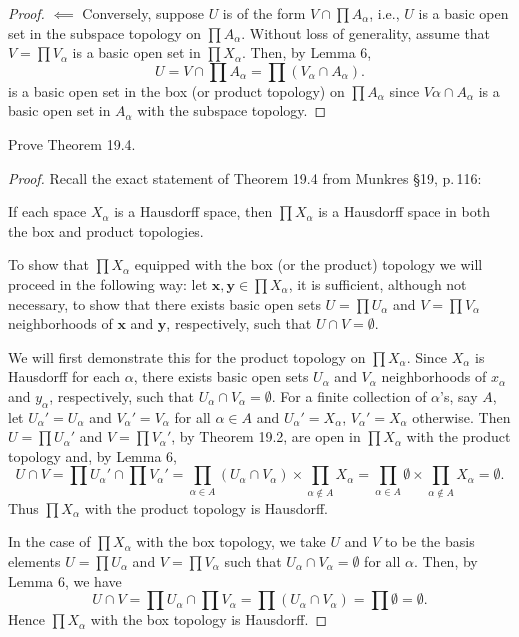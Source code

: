 \begin{proof}
$\impliedby$ Conversely, suppose $U$ is of the form $V\cap\prod
A_\alpha$, i.e., $U$ is a basic open set in the subspace topology
on $\prod A_\alpha$. Without loss of generality, assume that
$V=\prod V_\alpha$ is a basic open set in $\prod X_\alpha$. Then,
by Lemma 6,
\[
U=V\cap\prod A_\alpha=\prod\left(V_\alpha\cap A_\alpha\right).
\]
is a basic open set in the box (or product topology) on $\prod
A_\alpha$ since $V\alpha\cap A_\alpha$ is a basic open set in
$A_\alpha$ with the subspace topology.
\end{proof}
\newpage
\begin{problem}[Munkres \S19, p.\,118, \#3]
Prove Theorem 19.4.
\end{problem}
\begin{proof}
Recall the exact statement of Theorem 19.4 from Munkres \S19,
p.\,116:
\begin{theorem*}
If each space $X_\alpha$ is a Hausdorff space, then $\prod
X_\alpha$ is a Hausdorff space in both the box and product
topologies.
\end{theorem*}
To show that $\prod X_\alpha$ equipped with the box (or the
product) topology we will proceed in the following way: let
$\mathbf{x},\mathbf{y}\in\prod X_\alpha$, it is sufficient,
although not necessary, to show that there exists basic open sets
$U=\prod U_\alpha$ and $V=\prod V_\alpha$ neighborhoods of
$\mathbf{x}$ and $\mathbf{y}$, respectively, such that $U\cap
V=\emptyset$.

We will first demonstrate this for the product topology on $\prod
X_\alpha$. Since $X_\alpha$ is Hausdorff for each $\alpha$, there
exists basic open sets $U_\alpha$ and $V_\alpha$ neighborhoods of
$x_\alpha$ and $y_\alpha$, respectively, such that $U_\alpha\cap
V_\alpha=\emptyset$. For a finite collection of $\alpha$'s, say
$A$, let $U_\alpha'=U_\alpha$ and $V_\alpha'=V_\alpha$ for all
$\alpha\in A$ and $U_\alpha'=X_\alpha$, $V_\alpha'=X_\alpha$
otherwise. Then $U=\prod U_\alpha'$ and $V=\prod V_\alpha'$, by
Theorem 19.2, are open in $\prod X_\alpha$ with the product
topology and, by Lemma 6,
\[
U\cap V=\prod U_\alpha'\cap \prod V_\alpha'
=\prod_{\alpha\in A}\left(U_\alpha\cap
  V_\alpha\right)\times\prod_{\alpha\notin A}X_\alpha
=\prod_{\alpha\in A}\emptyset\times\prod_{\alpha\notin A}X_\alpha
=\emptyset.
\]
Thus $\prod X_\alpha$ with the product topology is Hausdorff.

In the case of $\prod X_\alpha$ with the box topology, we take
$U$ and $V$ to be the basis elements $U=\prod U_\alpha$ and
$V=\prod V_\alpha$ such that $U_\alpha\cap V_\alpha=\emptyset$
for all $\alpha$. Then, by Lemma 6, we have
\[
U\cap V=\prod U_\alpha\cap\prod V_\alpha
=\prod \left(U_\alpha\cap V_\alpha\right)
=\prod\emptyset=\emptyset.
\]
Hence $\prod X_\alpha$ with the box topology is Hausdorff.
\end{proof}
